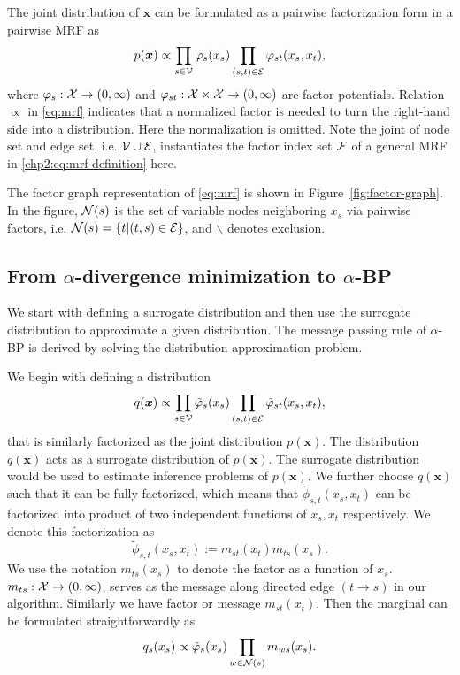 The joint distribution of $\bm{x}$ can be formulated as a pairwise factorization form in a pairwise MRF as
\begin{equation}\label{eq:mrf}
  p(\bm{x}) \propto \prod_{{s\in \mathcal{V}}} \varphi_s(x_s) \prod_{(s,t) \in \mathcal{E}} \varphi_{st}(x_s, x_t),
\end{equation}
where $\varphi_{s}: \mathcal{X} \rightarrow (0, \infty)$ and $\varphi_{st}: \mathcal{X} \times \mathcal{X} \rightarrow (0, \infty)$ are factor potentials. Relation $\propto$ in \eqref{eq:mrf} indicates that a normalized factor is needed to turn the right-hand side into a distribution. Here the normalization is omitted. Note the joint of node set and edge set, i.e. $\mathcal{V} \cup \mathcal{E}$, instantiates the factor index set $\mathcal{F}$ of a general MRF in \eqref{chp2:eq:mrf-definition} here.

The factor graph representation of \eqref{eq:mrf} is shown in
Figure~\ref{fig:factor-graph}. In the figure, $\mathcal{N}(s)$ is the set of variable nodes neighboring $x_s$ via
pairwise factors, i.e. $\mathcal{N}(s) = \left\{ t|(t,s) \in \mathcal{E} \right\}$, and $\backslash$ denotes exclusion.

\subsection{From $\alpha$-divergence minimization to $\alpha$-BP}
We start with defining a surrogate distribution and then use the surrogate distribution to approximate a given distribution. The message passing rule of $\alpha$-BP is derived by solving the distribution approximation problem.

We begin with defining a distribution
\begin{equation}
  q(\bm{x}) \propto \prod_{{s\in \mathcal{V}}} \tilde{\varphi}_s(x_s) \prod_{(s,t) \in \mathcal{E}} \tilde{\varphi}_{st}(x_s, x_t),
\end{equation}
that is similarly factorized as the joint distribution $p(\bm{x})$. The distribution $q(\bm{x})$ acts as a surrogate distribution of $p(\bm{x})$. The surrogate distribution would be used to estimate inference problems of $p(\bm{x})$. We further choose $q(\bm{x})$ such that it can be fully factorized, which means that $\tilde{\phi}_{s,t}(x_s, x_t)$ can be factorized into product of two independent functions of $x_s, x_t$ respectively. We denote this factorization as
\begin{equation}
  \tilde{\phi}_{s,t}(x_s, x_t) := m_{st}(x_t) m_{ts}(x_s).
\end{equation}
We use the notation $m_{ts}(x_s)$ to denote the factor as a function of $x_s$. $m_{ts}: \mathcal{X} \rightarrow (0, \infty)$, serves as the message along directed edge $(t \rightarrow s)$ in our algorithm. Similarly we have factor or message $m_{st}(x_t)$. Then the marginal can be formulated straightforwardly as
\begin{equation}
  q_s(x_s) \propto \tilde{\varphi}_s(x_s) \prod_{w\in \mathcal{N}(s)} m_{ws}(x_s).
\end{equation}

